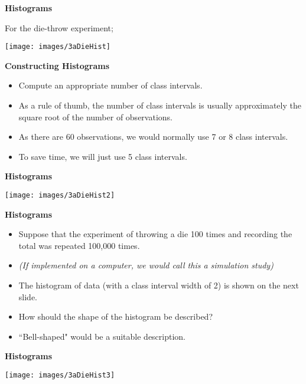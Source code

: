 \documentclass[]{report}
\begin{document}

{
\textbf{Histograms}

For the die-throw experiment;
\begin{center}
\texttt{[image: images/3aDieHist]}
\end{center}

}
{
\textbf{Constructing Histograms}

\begin{itemize}
\item Compute an appropriate number of class intervals.
\item As a rule of thumb, the number of class intervals is usually approximately the square root of the number of observations.
\item As there are 60 observations, we would normally use 7 or 8 class intervals.
\item To save time, we will just use 5 class intervals.
\end{itemize}

}


{
\textbf{Histograms}

\begin{center}
\texttt{[image: images/3aDieHist2]}
\end{center}

}

{
\textbf{Histograms}

\begin{itemize}
\item Suppose that the experiment of throwing a die 100 times and recording the total was repeated 100,000 times.
\item \textit{(If implemented on a computer, we would call this a simulation study)}
\item The histogram of data (with a class interval width of 2) is shown on the next slide.
\item How should the shape of the histogram be described?
\item ``Bell-shaped" would be a suitable description.
\end{itemize}
}

{
\textbf{Histograms}

\begin{center}
\texttt{[image: images/3aDieHist3]}
\end{center}

}
\end{document}

